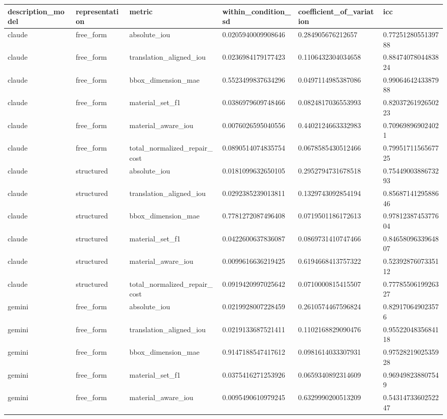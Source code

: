 \begin{tabular}{llllll}
description_model & representation & metric & within_condition_sd & coefficient_of_variation & icc \\\hline
claude & free\_form & absolute\_iou & 0.0205940009908646 & 0.284905676212657 & 0.7725128055139788 \\
claude & free\_form & translation\_aligned\_iou & 0.0236984179177423 & 0.1106432304034658 & 0.8847407804483824 \\
claude & free\_form & bbox\_dimension\_mae & 0.5523499837634296 & 0.0497114985387086 & 0.9906464243387988 \\
claude & free\_form & material\_set\_f1 & 0.0386979609748466 & 0.0824817036553993 & 0.8203726192650223 \\
claude & free\_form & material\_aware\_iou & 0.0076026595040556 & 0.4402124663332983 & 0.709698969024021 \\
claude & free\_form & total\_normalized\_repair\_cost & 0.0890514074835754 & 0.0678585430512466 & 0.7995171156567725 \\
claude & structured & absolute\_iou & 0.0181099632650105 & 0.2952794731678518 & 0.7544900388673293 \\
claude & structured & translation\_aligned\_iou & 0.0292385239013811 & 0.1329743092854194 & 0.8568714129588646 \\
claude & structured & bbox\_dimension\_mae & 0.7781272087496408 & 0.0719501186172613 & 0.9781238745377604 \\
claude & structured & material\_set\_f1 & 0.0422600637836087 & 0.0869731410747466 & 0.8465809633964807 \\
claude & structured & material\_aware\_iou & 0.0099616636219425 & 0.6194668413757322 & 0.5239287607335112 \\
claude & structured & total\_normalized\_repair\_cost & 0.0919420997025642 & 0.0710000815415507 & 0.7778550619926327 \\
gemini & free\_form & absolute\_iou & 0.0219928007228459 & 0.2610574467596824 & 0.829170649023576 \\
gemini & free\_form & translation\_aligned\_iou & 0.0219133687521411 & 0.1102168829090476 & 0.9552204835684118 \\
gemini & free\_form & bbox\_dimension\_mae & 0.9147188547417612 & 0.0981614033307931 & 0.9752821902535928 \\
gemini & free\_form & material\_set\_f1 & 0.0375416271253926 & 0.0659340892314609 & 0.969498238807549 \\
gemini & free\_form & material\_aware\_iou & 0.0095490610979245 & 0.6329990200513209 & 0.5431473360252247 \\

\end{tabular}
